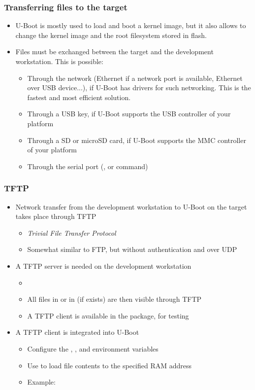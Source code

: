 \begin{frame}
  \frametitle{Transferring files to the target}
  \begin{itemize}
  \item U-Boot is mostly used to load and boot a kernel image, but it
    also allows to change the kernel image and the root filesystem
    stored in flash.
  \item Files must be exchanged between the target and the development
    workstation. This is possible:
    \begin{itemize}
    \item Through the network (Ethernet if a network port is available,
      Ethernet over USB device...), if U-Boot has drivers for such networking.
      This is the fastest and most efficient solution.
    \item Through a USB key, if U-Boot supports the USB controller of
      your platform
    \item Through a SD or microSD card, if U-Boot supports the MMC
      controller of your platform
    \item Through the serial port (,  or
       command)
    \end{itemize}
  \end{itemize}
\end{frame}

\begin{frame}
  \frametitle{TFTP}
  \begin{itemize}
  \item Network transfer from the development workstation to U-Boot
    on the target takes place through TFTP
    \begin{itemize}
    \item {\em Trivial File Transfer Protocol}
    \item Somewhat similar to FTP, but without authentication and over
      UDP
    \end{itemize}
  \item A TFTP server is needed on the development workstation
    \begin{itemize}
    \item {}
    \item All files in  or in 
      (if  exists) are then visible through TFTP
    \item A TFTP client is available in the  package,
      for testing
    \end{itemize}
  \item A TFTP client is integrated into U-Boot
    \begin{itemize}
    \item Configure the , , and
       environment variables
    \item Use  to load file contents to
      the specified RAM address
    \item Example: 
    \end{itemize}
  \end{itemize}
\end{frame}
